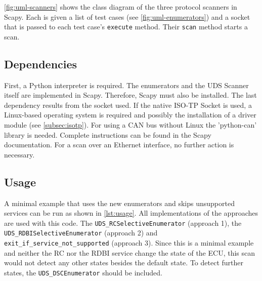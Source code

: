 \autoref{fig:uml-scanners} shows the class diagram of the three protocol scanners in Scapy. Each is given a list of test cases (see \autoref{fig:uml-enumerators}) and a socket that is passed to each test case's \texttt{execute} method. Their \texttt{scan} method starts a scan.

\subsection{Dependencies}

First, a Python interpreter is required.
The enumerators and the UDS Scanner itself are implemented in Scapy. Therefore, Scapy must also be installed. The last dependency results from the socket used. If the native ISO-TP Socket is used, a Linux-based operating system is required and possibly the installation of a driver module (see \autoref{subsec:isotp}). For using a CAN bus without Linux the 'python-can' library is needed. Complete instructions can be found in the Scapy documentation. For a scan over an Ethernet interface, no further action is necessary.

\subsection{Usage}

A minimal example that uses the new enumerators and skips unsupported services can be run as shown in \autoref{lst:usage}. All implementations of the approaches are used with this code. The \texttt{UDS_RCSelectiveEnumerator} (approach 1), the \texttt{UDS_RDBISelectiveEnumerator} (approach 2) and \texttt{exit_if_service_not_supported} (approach 3). Since this is a minimal example and neither the RC nor the RDBI service change the state of the ECU, this scan would not detect any other states besides the default state. To detect further states, the \texttt{UDS_DSCEnumerator} should be included.




